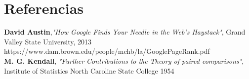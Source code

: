 \documentclass[a4paper]{article}
\begin{document}
\section{Referencias}
\textbf{David Austin},\textit{"How Google Finds Your Needle in the Web's Haystack"}, Grand Valley State University, 2013\\

https://www.dam.brown.edu/people/mchb/la/GooglePageRank.pdf\\

\textbf{M. G. Kendall}, \textit{"Further Contributions to the Theory of paired comparisons"}, Institute of Statistics North Caroline State College 1954\\



\end{document}
